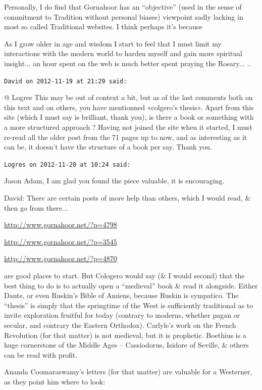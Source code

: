 \begin{footnotesize}
\begin{sffamily}
Personally, I do find that Gornahoor has an ``objective'' (used in the sense of commitment to Tradition without personal biases) viewpoint sadly lacking in most so called Traditional websites. I think perhaps it's because

As I grow older in age and wisdom I start to feel that I must limit my interactions with the modern world to harden myself and gain more spiritual insight... an hour spent on the web is much better spent praying the Rosary... ..

\hfill

\texttt{David on 2012-11-19 at 21:29 said:}

@ Logres This may be out of context a bit, but as of the last comments both on this text and on others, you have mentionned «colgero's thesis». Apart from this site (which I must say is brilliant, thank you), is there a book or something with a more structured approach ? Having not joined the site when it started, I must re-read all the older post from the 71 pages up to now, and as interesting as it can be, it doesn't have the structure of a book per say. Thank you.

\hfill

\texttt{Logres on 2012-11-20 at 10:24 said:}

Jason Adam, I am glad you found the piece valuable, it is encouraging.

David: There are certain posts of more help than others, which I would read, \& then go from there...

\url{http://www.gornahoor.net/?p=4798}

\url{http://www.gornahoor.net/?p=3545}

\url{http://www.gornahoor.net/?p=4870}

are good places to start. But Cologero would say (\& I would second) that the best thing to do is to actually open a ``medieval'' book \& read it alongside. Either Dante, or even Ruskin's Bible of Amiens, because Ruskin is sympatico. The ``thesis'' is simply that the springtime of the West is sufficiently traditional as to invite exploration fruitful for today (contrary to moderns, whether pagan or secular, and contrary the Eastern Orthodox). Carlyle's work on the French Revolution (for that matter) is not medieval, but it is prophetic. Boethius is a huge cornerstone of the Middle Ages -- Cassiodorus, Isidore of Seville, \& others can be read with profit.

Ananda Coomaraswamy's letters (for that matter) are valuable for a Westerner, as they point him where to look:


\end{sffamily}
\end{footnotesize}
